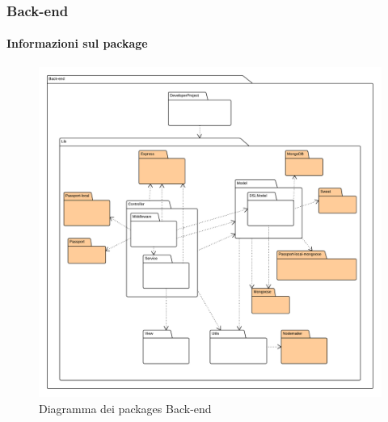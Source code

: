 
	\subsubsection{Back-end}
	\paragraph{Informazioni sul package} 
		\begin{figure}[H] 
			\begin{center} 
				\includegraphics[width=\textwidth]{uml/package/Back-end.png}  
				\caption{Diagramma dei packages Back-end}
			\end{center}  
		\end{figure} 
		
